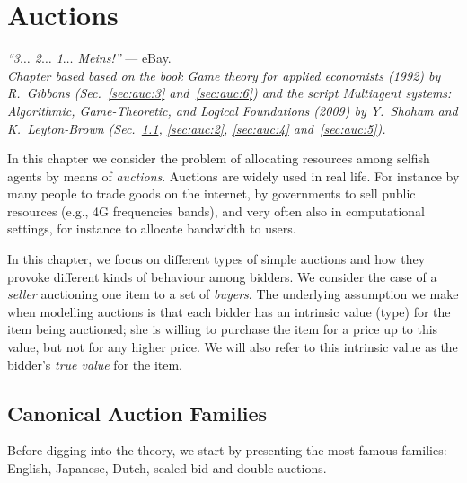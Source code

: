 \ifx \globalmark \undefined %
	
\else
\fi




\chapter{Auctions}
{\large{\itshape
``3$\dotsc$ 2$\dotsc$ 1$\dotsc$ Meins!''} --- eBay.\\
}
  {\small{\itshape
Chapter based based
on the book \emph{Game theory for applied economists} (1992) by R.\ Gibbons (Sec.~\ref{sec:auc:3} and~\ref{sec:auc:6}) and the script \emph{Multiagent systems: Algorithmic, Game-Theoretic, and Logical Foundations} (2009) by Y.\ Shoham and K.\ Leyton-Brown (Sec.~\ref{sec:auc:1}, \ref{sec:auc:2}, \ref{sec:auc:4} and~\ref{sec:auc:5}).}\\
}
\label{chap:Auct}


In this chapter we consider the problem of allocating resources among selfish agents by means of \emph{auctions}. Auctions are widely used in real life. For instance by many people to trade goods on the internet, by governments to sell public resources (e.g., 4G frequencies bands), and very often also in computational settings, for instance to allocate bandwidth to users.

In this chapter, we focus on different types of simple auctions and how they provoke different kinds of behaviour among bidders. We consider the case of a \emph{seller} auctioning one item to a set of \emph{buyers}.
The underlying assumption we make when modelling auctions is that each bidder has an intrinsic value (type) for the item being auctioned; she is willing to purchase the item for a price up to this value, but not for any higher price. We will also refer to this intrinsic value as the bidder's \emph{true value} for the item.



\section{Canonical Auction Families}
\label{sec:auc:1}
Before digging into the theory, we start by presenting the most famous families: English, Japanese, Dutch, sealed-bid and double auctions.

